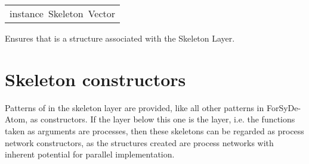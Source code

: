 \begin{haddockdesc}
\item[\begin{tabular}{@{}l}
instance\ Skeleton\ Vector
\end{tabular}]\haddockbegindoc
Ensures that  is a structure associated with the Skeleton Layer.\par

\end{haddockdesc}
\section{Skeleton constructors}
Patterns of in the skeleton layer are provided, like all other
 patterns in ForSyDe-Atom, as constructors. If the layer below
 this one is the  layer, i.e. the functions
 taken as arguments are processes, then these skeletons can be
 regarded as process network constructors, as the structures
 created are process networks with inherent potential for parallel
 implementation.\par

